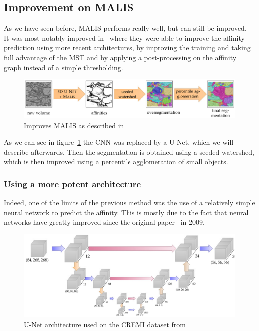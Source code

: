 \subsection{Improvement on MALIS}

As we have seen before, MALIS performs really well, but can still be
improved.\\
It was most notably improved in~\cite{funke_large_2019} where they were able to
improve the affinity prediction using more recent architectures, by improving
the training and taking full advantage of the MST and by applying a
post-processing on the affinity graph instead of a simple thresholding.

\begin{figure}[!htbp]
	\centering
	\includegraphics[width=0.8\linewidth]{./images/mala_process.png}
	\caption{Improves MALIS as described in~\cite{funke_large_2019}}%
	\label{fig:mala_process}
\end{figure}

As we can see in figure~\ref{fig:mala_process} the CNN was replaced by a U-Net,
which we will describe afterwards. Then the segmentation is obtained using a
seeded-watershed, which is then improved using a percentile agglomeration of
small objects.

\subsubsection{Using a more potent architecture}
Indeed, one of the limits of the previous method was the use of a relatively
simple neural network to predict the affinity. This is mostly due to the fact
that neural networks have greatly improved since the original
paper~\cite{turaga_maximin_2009} in 2009.\\

\begin{figure}[!htbp]
	\centering
	\includegraphics[width=0.8\linewidth]{./images/mala_architecture.png}
	\caption{U-Net architecture used on the CREMI dataset from~\cite{funke_large_2019}}%
	\label{fig:mala_unet}
\end{figure}


